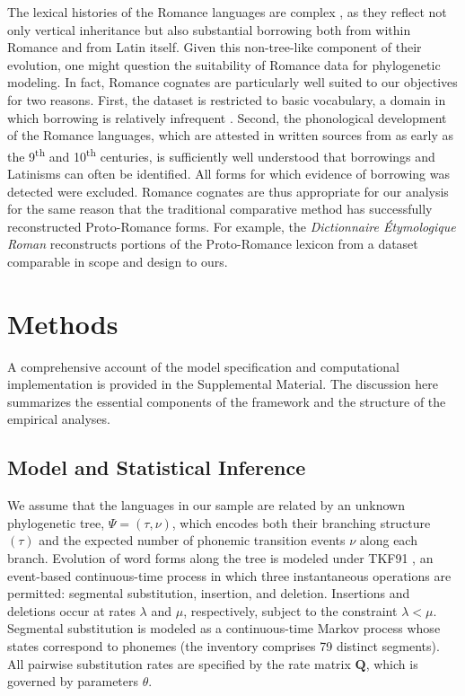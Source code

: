 \documentclass[numsec,webpdf,modern,large,namedate]{oup-authoring-template}
\begin{document}
The lexical histories of the Romance languages are complex \citep{Stefenelli1992,Dworkin2016b}, as they reflect not only vertical inheritance but also substantial borrowing both from within Romance and from Latin itself. Given this non-tree-like component of their evolution, one might question the suitability of Romance data for phylogenetic modeling. In fact, Romance cognates are particularly well suited to our objectives for two reasons. First, the dataset is restricted to basic vocabulary, a domain in which borrowing is relatively infrequent \citep{Tadmor2010,Carling2019}. Second, the phonological development of the Romance languages, which are attested in written sources from as early as the 9\textsuperscript{th} and 10\textsuperscript{th} centuries, is sufficiently well understood that borrowings and Latinisms can often be identified. All forms for which evidence of borrowing was detected were excluded. Romance cognates are thus appropriate for our analysis for the same reason that the traditional comparative method has successfully reconstructed Proto-Romance forms. For example, the \textit{Dictionnaire \'{E}tymologique Roman} \citep{Derom} reconstructs portions of the Proto-Romance lexicon from a dataset comparable in scope and design to ours. 

\section{Methods}
\label{PaperSections_MethodsSection}
A comprehensive account of the model specification and computational implementation is provided in the Supplemental Material. The discussion here summarizes the essential components of the framework and the structure of the empirical analyses. 

\subsection{Model and Statistical Inference}
\label{PaperSections_ModelInference}
We assume that the languages in our sample are related by an unknown phylogenetic tree, $\Psi = (\tau , \nu )$, which encodes both their branching structure $(\tau )$ and the expected number of phonemic transition events $\nu $ along each branch. Evolution of word forms along the tree is modeled under TKF91 \citep{Thorne1991}, an event-based continuous-time process in which three instantaneous operations are permitted: segmental substitution, insertion, and deletion. Insertions and deletions occur at rates $\lambda $ and $\mu $, respectively, subject to the constraint $\lambda < \mu $. Segmental substitution is modeled as a continuous-time Markov process whose states correspond to phonemes (the inventory comprises 79 distinct segments). All pairwise substitution rates are specified by the rate matrix $\mathbf{Q}$, which is governed by parameters $\textit{$\theta$}$. 
\end{document}

